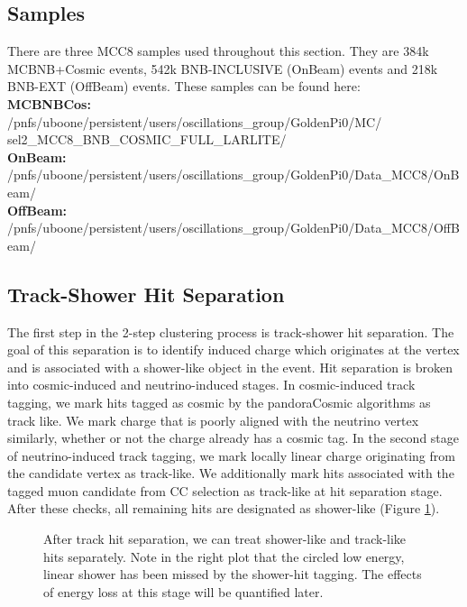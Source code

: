 \documentclass[12pt]{article}
\begin{document}
\subsection{Samples}
There are three MCC8 samples used throughout this section. They are 384k MCBNB+Cosmic events, 542k BNB-INCLUSIVE (OnBeam) events and 218k BNB-EXT (OffBeam) events. These samples can be found here:\\
\textbf{MCBNBCos:}
/pnfs/uboone/persistent/users/oscillations\_group/GoldenPi0/MC/\\ sel2\_MCC8\_BNB\_COSMIC\_FULL\_LARLITE/\\
\vspace{1 mm}
\textbf{OnBeam:}
/pnfs/uboone/persistent/users/oscillations\_group/GoldenPi0/Data\_MCC8/OnBeam/\\
\vspace{1 mm}
\textbf{OffBeam:}
/pnfs/uboone/persistent/users/oscillations\_group/GoldenPi0/Data\_MCC8/OffBeam/\\


\subsection{Track-Shower Hit Separation}
The first step in the 2-step clustering process is track-shower hit separation.  The goal of this separation is to identify induced charge which originates at the vertex and is associated with a shower-like object in the event. Hit separation is broken into cosmic-induced and neutrino-induced stages.  In cosmic-induced track tagging, we mark hits tagged as cosmic by the pandoraCosmic algorithms as track like.  We mark charge that is poorly aligned with the neutrino vertex similarly, whether or not the charge already has a cosmic tag.  In the second stage of neutrino-induced track tagging, we mark locally linear charge originating from the candidate vertex as track-like. We additionally mark hits associated with the tagged muon candidate from CC selection as track-like at hit separation stage. After these checks, all remaining hits are designated as shower-like (Figure \ref{fig:hitremoval}). 

\begin{figure}[h!]
\centering
{}
\caption{ After track hit separation, we can treat shower-like and track-like hits separately. Note in the right plot that the circled low energy, linear shower has been missed by the shower-hit tagging. The effects of energy loss at this stage will be quantified later. } 
\label{fig:hitremoval}
\end{figure}
\end{document}
